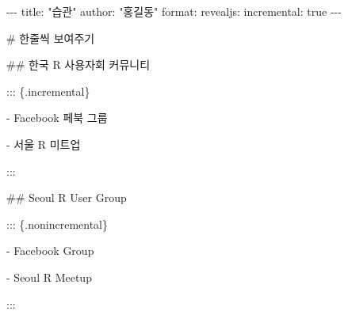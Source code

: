 \documentclass[
  letterpaper,
]{book}
\newenvironment{Shaded}{\begin{snugshade}}{\end{snugshade}}
\newcommand{\AnnotationTok}[1]{\textcolor[rgb]{0.37,0.37,0.37}{#1}}
\newcommand{\CommentTok}[1]{\textcolor[rgb]{0.37,0.37,0.37}{#1}}
\newcommand{\FunctionTok}[1]{\textcolor[rgb]{0.28,0.35,0.67}{#1}}
\newcommand{\NormalTok}[1]{\textcolor[rgb]{0.00,0.23,0.31}{#1}}
\newcommand{\SpecialStringTok}[1]{\textcolor[rgb]{0.13,0.47,0.30}{#1}}
\begin{document}
\begin{Shaded}
\begin{Highlighting}[]
\CommentTok{{-}{-}{-}}
\AnnotationTok{title:}\CommentTok{ "습관"}
\AnnotationTok{author:}\CommentTok{ "홍길동"}
\AnnotationTok{format:}
\CommentTok{  revealjs:}
\CommentTok{    incremental: true}
\CommentTok{{-}{-}{-}}

\FunctionTok{\# 한줄씩 보여주기}

\FunctionTok{\#\# 한국 R 사용자회 커뮤니티}

\NormalTok{::: \{.incremental\}}

\SpecialStringTok{{-} }\NormalTok{Facebook 페북 그룹}

\SpecialStringTok{{-} }\NormalTok{서울 R 미트업}

\NormalTok{:::}


\FunctionTok{\#\# Seoul R User Group}

\NormalTok{::: \{.nonincremental\}}

\SpecialStringTok{{-} }\NormalTok{Facebook Group}

\SpecialStringTok{{-} }\NormalTok{Seoul R Meetup}

\NormalTok{:::}
\end{Highlighting}
\end{Shaded}
\end{document}
